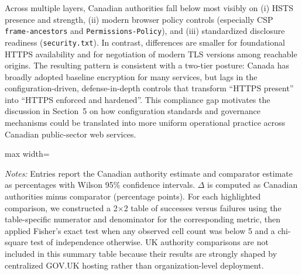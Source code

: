 \documentclass[a4paper,fleqn]{cas-sc}
\begin{document}
    Across multiple layers, Canadian authorities fall below most visibly on 
    (i) HSTS presence and strength, 
    (ii) modern browser policy controls (especially CSP \texttt{frame-ancestors} and \texttt{Permissions-Policy}), and 
    (iii) standardized disclosure readiness (\texttt{security.txt}). 
    In contrast, differences are smaller for foundational HTTPS availability and for negotiation of modern TLS versions among reachable origins. 
    The resulting pattern is consistent with a two-tier posture: Canada has broadly adopted baseline encryption for many services, but lags in the configuration-driven, defense-in-depth controls that transform ``HTTPS present'' into ``HTTPS enforced and hardened''. 
    This compliance gap motivates the discussion in Section~5 on how configuration standards and governance mechanisms could be translated into more uniform operational practice across Canadian public-sector web services.

\begin{table}[t]
  \caption{Statistical support for principal comparative claims.}
  \label{tab:stats_summary}
  \centering
  \scriptsize
  \setlength{\tabcolsep}{3pt}
  \renewcommand{\arraystretch}{1.15}

  \begin{adjustbox}{max width=\columnwidth}
  \end{adjustbox}

  \vspace{2mm}
  \footnotesize
  \emph{Notes:} Entries report the Canadian authority estimate and comparator estimate as percentages with Wilson 95\% confidence intervals. $\Delta$ is computed as Canadian authorities minus comparator (percentage points). For each highlighted comparison, we constructed a 2$\times$2 table of successes versus failures using the table-specific numerator and denominator for the corresponding metric, then applied Fisher's exact test when any observed cell count was below 5 and a chi-square test of independence otherwise. UK authority comparisons are not included in this summary table because their results are strongly shaped by centralized GOV.UK hosting rather than organization-level deployment.
\end{table}
\end{document}
